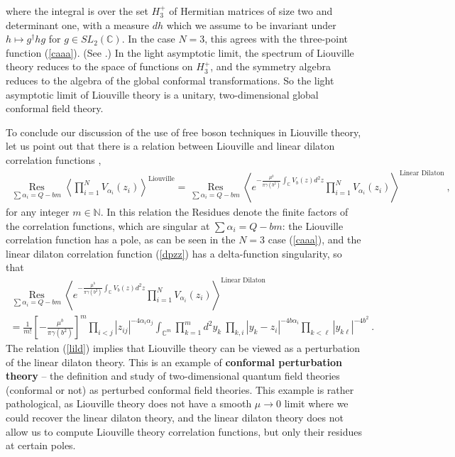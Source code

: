 \documentclass[12pt,a4paper,notitlepage]{report}
\newcommand \la {\left\langle}
\newcommand \ra {\right\rangle}
\newcommand \N {\mathbb{N}}
\newcommand \C {\mathbb{C}}
\numberwithin{equation}{section}
\theoremstyle{break}
\begin{document}
where the integral is over the set \textbf{\boldmath $H_3^+$} of Hermitian matrices of size two and determinant one, with a measure $dh$ which we assume to be invariant under $h\mapsto g^\dagger hg$ for $g\in SL_2(\C)$. In the case $N=3$, this agrees with the three-point function (\ref{caaa}). (See \cite{zz95}.) In the light asymptotic limit, the spectrum of Liouville theory reduces to the space of functions on $H_3^+$, and the symmetry algebra reduces to the algebra of the global conformal transformations. So
the light asymptotic limit of Liouville theory is a unitary, two-dimensional global conformal field theory.

To conclude our discussion of the use of free boson techniques in Liouville theory, let us point out that there is a relation between Liouville and linear dilaton correlation functions \cite{zz95},
\begin{align}
 \underset{\sum \alpha_i = Q-bm}{\operatorname{Res}} \la \prod_{i=1}^N V_{\alpha_i}(z_i)\ra^{\text{Liouville}} = \underset{\sum\alpha_i = Q-bm}{\operatorname{Res}} \la e^{-\frac{\mu^b}{\pi\gamma(b^2)}\int_\C V_b(z)d^2z}\prod_{i=1}^N V_{\alpha_i}(z_i)\ra^{\text{Linear\ Dilaton}}\ , 
\label{lild}
\end{align}
for any integer $m\in \N$. In this relation the Residues denote the finite factors of the correlation functions, which are singular at $\sum \alpha_i = Q-bm$: the Liouville correlation function has a pole, as can be 
seen in the $N=3$ case (\ref{caaa}), and the linear dilaton correlation function (\ref{dpzz}) has a delta-function singularity, so that 
\begin{multline}
 \underset{\sum\alpha_i = Q-bm}{\operatorname{Res}} \la e^{-\frac{\mu^b}{\pi\gamma(b^2)}\int_\C V_b(z)d^2z}\prod_{i=1}^N V_{\alpha_i}(z_i)\ra^{\text{Linear\ Dilaton}}
\\
= \frac{1}{m!}\left[-\frac{\mu^b}{\pi\gamma(b^2)}\right]^m \prod_{i<j} |z_{ij}|^{-4\alpha_i\alpha_j} \int_{\C^m} \prod_{k=1}^m d^2y_k\ \prod_{k,i} |y_k-z_i|^{-4b\alpha_i}\prod_{k<\ell} |y_{k\ell}|^{-4b^2}\ .
\label{mint}
\end{multline}
The relation (\ref{lild}) implies that Liouville theory can be viewed as a perturbation of the linear dilaton theory. This is an example of \textbf{\boldmath conformal perturbation theory} -- the definition and study of two-dimensional quantum field theories (conformal or not) as perturbed conformal field theories. This example is rather pathological, as Liouville theory does not have a smooth $\mu\rightarrow 0$ limit where we could recover the linear dilaton theory, and the linear dilaton theory does not allow us to compute Liouville theory correlation functions, but only their residues at certain poles. 
\end{document}
